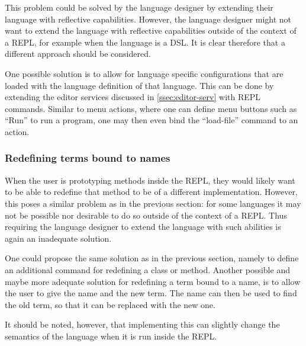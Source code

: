 This problem could be solved by the language designer by extending
their language with reflective capabilities. However, the language
designer might not want to extend the language with reflective
capabilities outside of the context of a REPL, for example when the
language is a DSL. It is clear therefore that a different approach
should be considered.

One possible solution is to allow for language specific configurations
that are loaded with the language definition of that language. This
can be done by extending the editor services discussed in
\cref{ssec:editor-serv} with REPL commands. Similar to menu actions,
where one can define menu buttons such as ``Run'' to run a program, one may
then even bind the ``load-file'' command to an action.

\subsubsection{Redefining terms bound to names}
\label{sec:redef-cont-bound}
When the user is prototyping methods inside the REPL, they would
likely want to be able to redefine that method to be of a different
implementation. However, this poses a similar problem as in the
previous section: for some languages it may not be possible nor
desirable to do so outside of the context of a REPL. Thus requiring
the language designer to extend the language with such abilities is
again an inadequate solution.

One could propose the same solution as in the previous section, namely to
define an additional command for redefining a class or method. Another possible
and maybe more adequate solution for redefining a term bound to a name, is to
allow the user to give the name and the new term. The name can then be used to
find the old term, so that it can be replaced with the new one.

It should be noted, however, that implementing this can slightly change the
semantics of the language when it is run inside the REPL.

